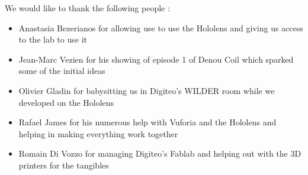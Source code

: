 \documentclass[sigchi, authorversion, screen]{acmart}
\begin{document}
%
\begin{acks}
We would like to thank the following people :
\begin{itemize}
    \item Anastasia Bezerianos for allowing use to use the Hololens and giving us access to the lab to use it
    \item Jean-Marc Vezien for his showing of episode 1 of Denou Coil which sparked some of the initial ideas
    \item Olivier Gladin for babysitting us in Digiteo's WILDER room while we developed on the Hololens
    \item Rafael James for his numerous help with Vuforia and the Hololens and helping in making everything work together
    \item Romain Di Vozzo for managing Digiteo's Fablab and helping out with the 3D printers for the tangibles
\end{itemize}
\end{acks}

%



\end{document}
